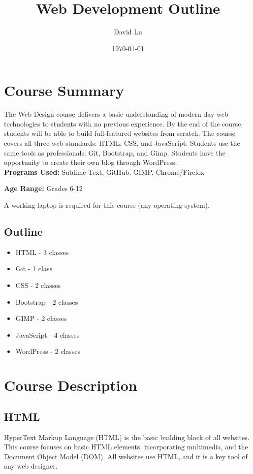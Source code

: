 \documentclass{article}
\begin{document}
	\title{Web Development Outline}
	\date{\today}
	\author{David Lu}
	\maketitle
	
	\section{Course Summary}
	The Web Design course delivers a basic understanding of modern day web technologies to students with no previous experience. By the end of the course, students will be able to build full-featured websites from scratch. The course covers all three web standards: HTML, CSS, and JavaScript. Students use the same tools as professionals: Git, Bootstrap, and Gimp. Students have the opportunity to create their own blog through WordPress..\\
	
	\textbf{Programs Used:} Sublime Text, GitHub, GIMP, Chrome/Firefox
	
	\textbf{Age Range:} Grades 6-12
	
	A working laptop is required for this course (any operating system).
	
	\subsection{Outline}
	\begin{itemize}
		\item{HTML - 3 classes}
		\item{Git - 1 class}
		\item{CSS - 2 classes}
		\item{Bootstrap - 2 classes}
		\item{GIMP - 2 classes}
		\item{JavaScript - 4 classes}
		\item{WordPress - 2 classes}
	\end{itemize}
	
	\section{Course Description}
	
	\subsection{HTML}
	
	HyperText Markup Language (HTML) is the basic building block of all websites. This course focuses on basic HTML elements, incorporating multimedia, and the Document Object Model (DOM). All websites use HTML, and it is a key tool of any web designer.
	
\end{document}
